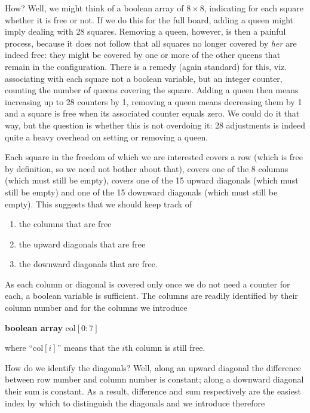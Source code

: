 How? Well, we might think of a boolean array of $8\times 8$, indicating for each square whether it is free or not. If we do this for the full board, adding a queen might imply dealing with 28 squares. Removing a queen, however, is then a painful process, because it does not follow that all squares no longer covered by \textit{her} are indeed free: they might be covered by one or more of the other queens that remain in the configuration. There is a remedy (again standard) for this, viz. associating with each square not a boolean variable, but an integer counter, counting the number of queens covering the square. Adding a queen then means increasing up to 28 counters by 1, removing a queen means decreasing them by 1 and a square is free when its associated counter equals zero. We could do it that way, but the question is whether this is not overdoing it: 28 adjustments is indeed quite a heavy overhead on setting or removing a queen.

Each square in the freedom of which we are interested covers a row (which is free by definition, so we need not bother about that), covers one of the 8 columns (which must still be empty), covers one of the 15 upward diagonals (which must still be empty) and one of the 15 downward diagonals (which must still be empty). This suggests that we should keep track of

\begin{enumerate}[wide, nosep, label=(\arabic*)]
	\item the columns that are free
	\item the upward diagonals that are free
	\item the downward diagonals that are free.
\end{enumerate}

As each column or diagonal is covered only once we do not need a counter for each, a boolean variable is sufficient. The columns are readily identified by their column number and for the columns we introduce

\textbf{boolean array} col$[0:7]$

\noindent
where ``col$[i]$'' means that the $i$th column is still free.

How do we identify the diagonals? Well, along an upward diagonal the difference between row number and column number is constant; along a downward diagonal their sum is constant. As a result, difference and sum respectively are the easiest index by which to distinguish the diagonals and we introduce therefore

